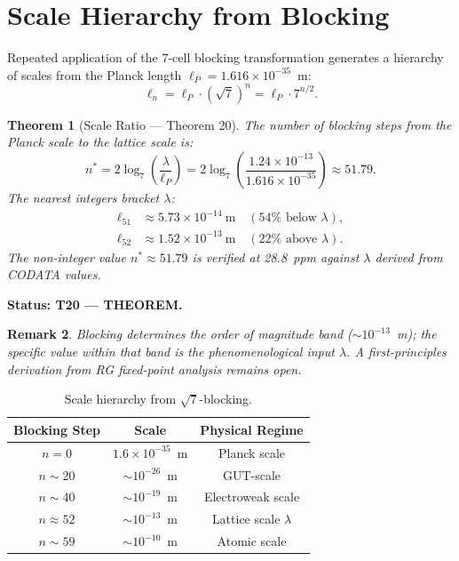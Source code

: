 \documentclass[11pt,letterpaper]{article}
\newtheorem{theorem}{Theorem}[section]
\newtheorem{remark}[theorem]{Remark}
\begin{document}
\section{Scale Hierarchy from Blocking}\label{sec:scales}

Repeated application of the 7-cell blocking transformation generates a
hierarchy of scales from the Planck length $\ell_P = 1.616\times10^{-35}$~m:
\begin{equation}
  \ell_n = \ell_P \cdot (\sqrt{7})^n = \ell_P \cdot 7^{n/2}.
\end{equation}

\begin{theorem}[Scale Ratio --- Theorem 20]\label{thm:T20}
The number of blocking steps from the Planck scale to the lattice scale is:
\begin{equation}
  n^* = 2\log_7\!\left(\frac{\lambda}{\ell_P}\right)
  = 2\log_7\!\left(\frac{1.24\times10^{-13}}{1.616\times10^{-35}}\right)
  \approx 51.79.
\end{equation}
The nearest integers bracket $\lambda$:
\begin{align}
  \ell_{51} &\approx 5.73\times10^{-14}~\text{m} \quad (54\%\text{ below }\lambda),\\
  \ell_{52} &\approx 1.52\times10^{-13}~\text{m} \quad (22\%\text{ above }\lambda).
\end{align}
The non-integer value $n^*\approx51.79$ is verified at 28.8~ppm against
$\lambda$ derived from CODATA values.
\end{theorem}

\textbf{Status: T20 --- THEOREM.}

\begin{remark}
Blocking determines the order of magnitude band ($\sim10^{-13}$~m);
the specific value within that band is the phenomenological input $\lambda$.
A first-principles derivation from RG fixed-point analysis remains open.
\end{remark}

\begin{table}[h]
\centering
\begin{tabular}{ccc}
\toprule
\textbf{Blocking Step} & \textbf{Scale} & \textbf{Physical Regime} \\
\midrule
$n=0$   & $1.6\times10^{-35}$~m & Planck scale \\
$n\sim20$ & $\sim10^{-26}$~m & GUT-scale \\
$n\sim40$ & $\sim10^{-19}$~m & Electroweak scale \\
$n\approx52$ & $\sim10^{-13}$~m & Lattice scale $\lambda$ \\
$n\sim59$ & $\sim10^{-10}$~m & Atomic scale \\
\bottomrule
\end{tabular}
\caption{Scale hierarchy from $\sqrt{7}$-blocking.}
\end{table}
\end{document}
